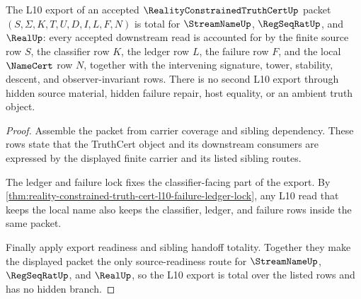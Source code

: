 \begin{theorem}
\label{thm:reality-constrained-truth-cert-l10-export-totality}
The L10 export of an accepted $\RealityConstrainedTruthCertUp$ packet
$(S,\Sigma,K,T,U,D,I,L,F,N)$ is total for $\StreamNameUp$, $\RegSeqRatUp$, and
$\RealUp$: every accepted downstream read is accounted for by the finite source
row $S$, the classifier row $K$, the ledger row $L$, the failure row $F$, and
the local $\NameCert$ row $N$, together with the intervening signature, tower,
stability, descent, and observer-invariant rows. There is no second L10 export
through hidden source material, hidden failure repair, host equality, or an
ambient truth object.
\end{theorem}
\begin{proof}
Assemble the packet from carrier coverage and sibling dependency. These rows
state that the TruthCert object and its downstream consumers are expressed by
the displayed finite carrier and its listed sibling routes.

The ledger and failure lock fixes the classifier-facing part of the export.
By \autoref{thm:reality-constrained-truth-cert-l10-failure-ledger-lock}, any
L10 read that keeps the local name also keeps the classifier, ledger, and
failure rows inside the same packet.

Finally apply export readiness and sibling handoff totality. Together they
make the displayed packet the only source-readiness route for
$\StreamNameUp$, $\RegSeqRatUp$, and $\RealUp$, so the L10 export is total over
the listed rows and has no hidden branch.
\end{proof}

